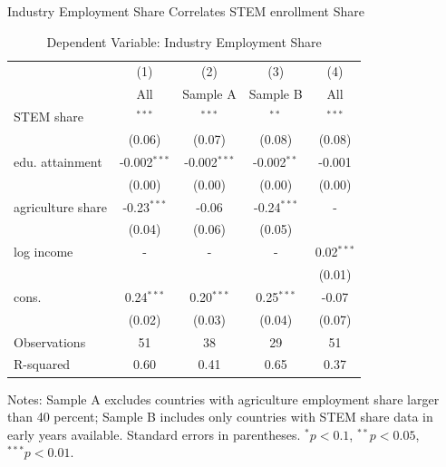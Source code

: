 \documentclass[9pt,xcolor={svgnames}]{beamer}
\begin{document}
\begin{frame}{Industry Employment Share Correlates STEM enrollment Share}
\begin{table}[htbp]
\centering
\begin{threeparttable}
\caption{Dependent Variable: Industry Employment Share}
\begin{tabular}{lcccc}
\toprule
 & (1) & (2) & (3) & (4) \\
 & All &  Sample A & Sample B & All \\
\midrule
STEM share & \color{red}{0.26}$^{***}$ & \color{red}{0.29}$^{***}$ & \color{red}{0.19}$^{**}$  & \color{red}{0.29}$^{***}$ \\
          & (0.06)       & (0.07)      & (0.08)    &(0.08) \\
edu. attainment & -0.002$^{***}$ & -0.002$^{***}$ & -0.002$^{**}$ & -0.001 \\
          & (0.00)       & (0.00)       & (0.00)    & (0.00) \\
agriculture share & -0.23$^{***}$       & -0.06       & -0.24$^{***}$  & -    \\
          & (0.04)       & (0.06)       & (0.05)     \\
  log income & -       & -      &  - &  0.02$^{***}$    \\
          &        &       &   & (0.01)    \\        
cons. & 0.24$^{***}$       & 0.20$^{***}$        & 0.25$^{***}$  & -0.07     \\
          & (0.02)       & (0.03)       & (0.04)    & (0.07) \\ 
\midrule
Observations & 51 & 38 & 29 & 51 \\
R-squared    & 0.60 & 0.41 & 0.65 & 0.37 \\
\bottomrule
\end{tabular}
\begin{tablenotes}
\small
\item Notes: Sample A excludes countries with agriculture employment share larger than 40 percent; Sample B includes only countries with STEM share data in early years available.
Standard errors in parentheses. $^{*}p<0.1$, $^{**}p<0.05$, $^{***}p<0.01$.
\end{tablenotes}
\end{threeparttable}
\end{table}
\end{frame}
\end{document}
